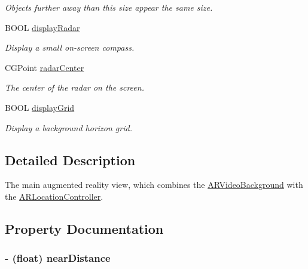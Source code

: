 \begin{DoxyCompactItemize}
\begin{DoxyCompactList}\small\item\em \-Objects further away than this size appear the same size. \end{DoxyCompactList}\item 
\hypertarget{interface_a_r_browser_view_a541177be5371872bc4153d8eb8805ff2}{
\-B\-O\-O\-L \hyperlink{interface_a_r_browser_view_a541177be5371872bc4153d8eb8805ff2}{display\-Radar}}
\label{interface_a_r_browser_view_a541177be5371872bc4153d8eb8805ff2}

\begin{DoxyCompactList}\small\item\em \-Display a small on-\/screen compass. \end{DoxyCompactList}\item 
\-C\-G\-Point \hyperlink{interface_a_r_browser_view_ab390eeb9f2a9ce554dbbea33227cb389}{radar\-Center}
\begin{DoxyCompactList}\small\item\em \-The center of the radar on the screen. \end{DoxyCompactList}\item 
\hypertarget{interface_a_r_browser_view_a767b94294f4358686e88d043198b9881}{
\-B\-O\-O\-L \hyperlink{interface_a_r_browser_view_a767b94294f4358686e88d043198b9881}{display\-Grid}}
\label{interface_a_r_browser_view_a767b94294f4358686e88d043198b9881}

\begin{DoxyCompactList}\small\item\em \-Display a background horizon grid. \end{DoxyCompactList}\end{DoxyCompactItemize}


\subsection{\-Detailed \-Description}
\-The main augmented reality view, which combines the \hyperlink{interface_a_r_video_background}{\-A\-R\-Video\-Background} with the \hyperlink{interface_a_r_location_controller}{\-A\-R\-Location\-Controller}. 

\subsection{\-Property \-Documentation}
\hypertarget{interface_a_r_browser_view_a7d1856b25014bdbb42e053808fed67b5}{
\subsubsection[{near\-Distance}]{\setlength{\rightskip}{0pt plus 5cm}-\/ (float) near\-Distance}}
\label{interface_a_r_browser_view_a7d1856b25014bdbb42e053808fed67b5}


